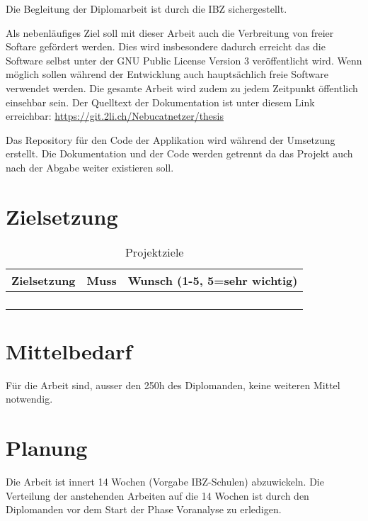 \documentclass[a4paper,11pt]{article}
\begin{document}
Die Begleitung der Diplomarbeit ist durch die IBZ sichergestellt.

Als nebenläufiges Ziel soll mit dieser Arbeit auch die Verbreitung von
freier Softare gefördert werden. Dies wird insbesondere dadurch
erreicht das die Software selbst unter der GNU Public License Version
3 veröffentlicht wird. Wenn möglich sollen während der Entwicklung
auch hauptsächlich freie Software verwendet werden. Die gesamte Arbeit
wird zudem zu jedem Zeitpunkt öffentlich einsehbar sein. Der Quelltext
der Dokumentation ist unter diesem Link erreichbar:
\url{https://git.2li.ch/Nebucatnetzer/thesis}

Das Repository für den Code der Applikation wird während der Umsetzung
erstellt. Die Dokumentation und der Code werden getrennt da das
Projekt auch nach der Abgabe weiter existieren soll.

\section{Zielsetzung}
\label{sec:org0692617}

\begin{table}[htbp]
\centering
\begin{tabular}{|p{9cm}|p{1.5cm}|p{2cm}|}
\hline
\textbf{Zielsetzung}\cellcolor[HTML]{C0C0C0} & \textbf{Muss}\cellcolor[HTML]{C0C0C0} & \textbf{Wunsch} (1-5, 5=sehr wichtig)\cellcolor[HTML]{C0C0C0}\\
\hline
 &  & \\
\hline
 &  & \\
\hline
 &  & \\
\hline
 &  & \\
\hline
\end{tabular}
\caption{\label{tab:orgba698b7}
Projektziele}

\end{table}

\section{Mittelbedarf}
\label{sec:orgc335aa3}

Für die Arbeit sind, ausser den 250h des Diplomanden, keine weiteren
Mittel notwendig.

\section{Planung}
\label{sec:orgb688b2c}

Die Arbeit ist innert 14 Wochen (Vorgabe IBZ-Schulen) abzuwickeln. Die
Verteilung der anstehenden Arbeiten auf die 14 Wochen ist durch den
Diplomanden vor dem Start der Phase Voranalyse zu erledigen.
\end{document}
